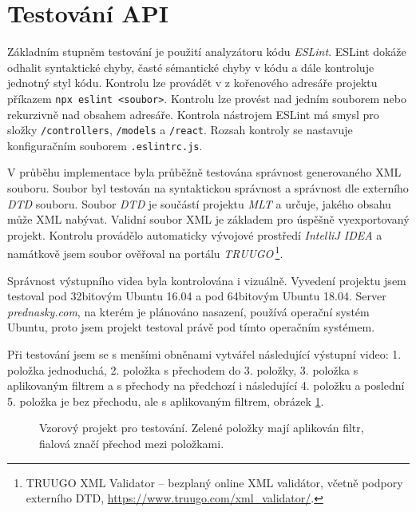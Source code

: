 \section{Testování API}
Základním stupněm testování je použití analyzátoru kódu \textit{ESLint}. ESLint dokáže odhalit syntaktické chyby, časté sémantické chyby v kódu a dále kontroluje jednotný styl kódu. Kontrolu lze provádět v z kořenového adresáře projektu příkazem \texttt{npx eslint <soubor>}. Kontrolu lze provést nad jedním souborem nebo rekurzivně nad obsahem adresáře. Kontrola nástrojem ESLint má smysl pro složky \texttt{/controllers}, \texttt{/models} a \texttt{/react}. Rozsah kontroly se nastavuje konfiguračním souborem \texttt{.eslintrc.js}.

V průběhu implementace byla průběžně testována správnost generovaného XML souboru. Soubor byl testován na syntaktickou správnost a správnost dle externího \textit{DTD} souboru. Soubor \textit{DTD} je součástí projektu \textit{MLT} a určuje, jakého obsahu může XML nabývat. Validní soubor XML je základem pro úspěšně vyexportovaný projekt. Kontrolu provádělo automaticky vývojové prostředí \textit{IntelliJ IDEA} a namátkově jsem soubor ověřoval na portálu \textit{TRUUGO}\,\footnote{TRUUGO XML Validator -- bezplaný online XML validátor, včetně podpory externího DTD, \url{https://www.truugo.com/xml_validator/}.}.

Správnost výstupního videa byla kontrolována i vizuálně. Vyvedení projektu jsem testoval pod 32bitovým Ubuntu 16.04 a pod 64bitovým Ubuntu 18.04. Server \textit{prednasky.com}, na kterém je plánováno nasazení, používá operační systém Ubuntu, proto jsem projekt testoval právě pod tímto operačním systémem.

Při testování jsem se s menšími obněnami vytvářel následující výstupní video: 1. položka jednoduchá, 2. položka s přechodem do 3. položky, 3. položka s aplikovaným filtrem a s přechody na předchozí i následující 4. položku a poslední 5. položka je bez přechodu, ale s aplikovaným filtrem, obrázek \ref{img:testcase}.
\begin{figure}[h]
	\centering
	\caption{Vzorový projekt pro testování. Zelené položky mají aplikován filtr, fialová značí přechod mezi položkami.}\label{img:testcase}
\end{figure}

